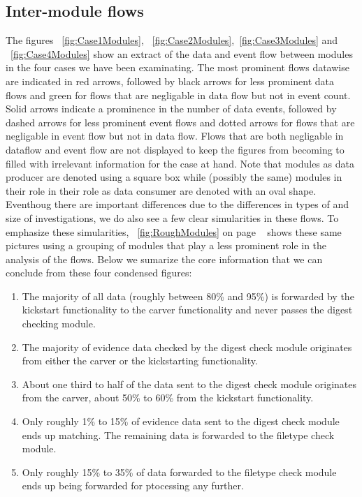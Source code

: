 \subsection{Inter-module flows}
The figures ~\ref{fig:Case1Modules}, ~\ref{fig:Case2Modules},~\ref{fig:Case3Modules} and ~\ref{fig:Case4Modules} show an extract of the data and event flow between modules in the four cases we have been examinating. The most prominent flows datawise are indicated in red arrows, followed by black arrows for less prominent data flows and green for flows that are negligable in data flow but not in event count. Solid arrows indicate a prominence in the number of data events, followed by dashed arrows for less prominent event flows and dotted arrows for flows that are
negligable in event flow but not in data flow. Flows that are both negligable in dataflow and event flow are not displayed to keep the figures from becoming to filled with irrelevant information for the case at hand. Note that modules as data producer are denoted using a square box while (possibly the same) modules in their role in their role as data consumer are denoted with an oval shape. Eventhoug there are important differences due to the differences in types of and size of investigations, we do also see a few clear simularities in these flows. To emphasize these simularities, ~\ref{fig:RoughModules} on page ~\pageref{fig:RoughModules} shows these same pictures using a grouping of modules that play a less prominent role in the analysis of the flows. Below we sumarize the core information that we can conclude from these four condensed figures:
\begin{enumerate}
\item The majority of all data (roughly between 80\% and 95\%) is forwarded by the kickstart functionality to the carver functionality and never passes the digest checking module.
\item The majority of evidence data checked by the digest check module originates from either the carver or the kickstarting functionality.
\item About one third to half of the data sent to the digest check module originates from the carver, about 50\% to 60\% from the kickstart functionality.
\item Only roughly 1\% to 15\% of evidence data sent to the digest check module ends up matching. The remaining data is forwarded to the filetype check module.
\item Only roughly 15\% to 35\% of data forwarded to the filetype check module ends up being forwarded for ptocessing any further.
\end{enumerate} 
